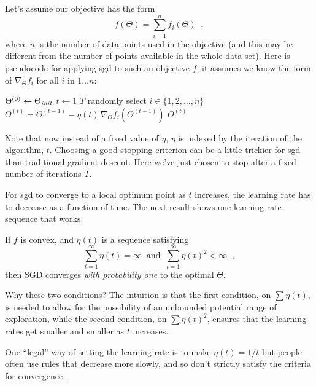 Let's assume our objective has the form
\[
  f(\Theta) = \sum_{i = 1}^n f_i(\Theta)
  \;\;,
\]
where $n$ is the number of data points used in the objective (and this
may be different from the number of points available in the whole data
set).  Here is pseudocode for applying {\sc sgd} to such an objective $f$;
it assumes we know the form of $\nabla_\Theta f_i$ for all $i$ in
$1\ldots n$:
\begin{codebox}
  \li $\Theta^{(0)} \gets \Theta_{\it init}$
  \li \For $t \gets 1$ \To $T$
  \li \Do
  randomly select $i \in \{1, 2, \dots, n\}$
  \li   $\Theta^{(t)} = \Theta^{(t-1)} - \eta(t) \, \nabla_\Theta f_i(\Theta^{(t-1)})$
  \End
  \li \Return $\Theta^{(t)}$
\end{codebox}

Note that now instead of a fixed  value of $\eta$, $\eta$ is indexed by
the iteration of the algorithm, $t$.
Choosing a good stopping criterion can be a little trickier for {\sc sgd} than
traditional gradient descent. Here we've just chosen
to stop after a fixed number of iterations $T$.

For {\sc sgd} to converge to a local optimum point as $t$ increases, the
learning rate has to decrease as a function of time. The next result shows one
learning rate sequence that works.

\begin{theorem}
  If $f$ is convex, and $\eta(t)$ is a sequence satisfying
  $$ \sum_{t = 1}^{\infty}\eta(t) = \infty \;\;\text{and}\;\;
    \sum_{t = 1}^{\infty}\eta(t)^2 < \infty \;\;,$$
  then SGD converges {\em with probability one}
  to the optimal $\Theta$.
\end{theorem}

Why these two conditions?  The intuition is that the first condition,
on $\sum \eta(t)$, is needed to allow for the possibility of an
unbounded potential range of exploration, while the second condition,
on $\sum\eta(t)^2$, ensures that the learning rates get smaller and
smaller as $t$ increases.

One ``legal'' way of setting the learning rate is to make $\eta(t) = 1/t$ but
people often use rules that decrease more slowly, and so don't
strictly satisfy the criteria for convergence.

